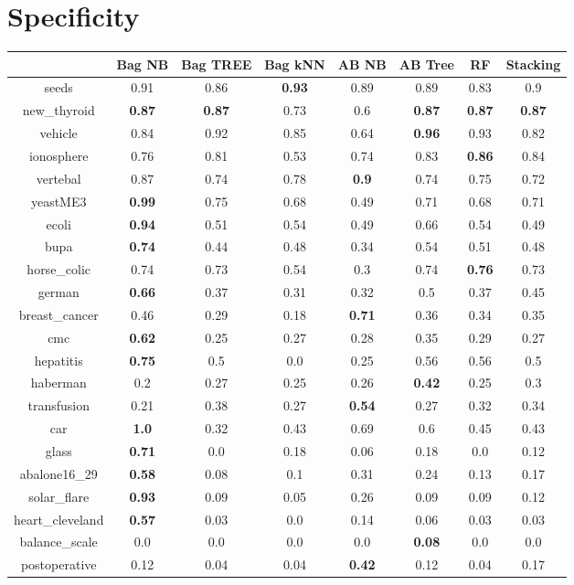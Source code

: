 \documentclass{article}%
\begin{document}
%
\section*{Specificity}%
\begin{tabular}{c|ccccccc}%
&Bag NB&Bag TREE&Bag kNN&AB NB&AB Tree&RF&Stacking\\%
\hline%
seeds&0.91&0.86&\textbf{0.93}&0.89&0.89&0.83&0.9\\%
new\_thyroid&\textbf{0.87}&\textbf{0.87}&0.73&0.6&\textbf{0.87}&\textbf{0.87}&\textbf{0.87}\\%
vehicle&0.84&0.92&0.85&0.64&\textbf{0.96}&0.93&0.82\\%
ionosphere&0.76&0.81&0.53&0.74&0.83&\textbf{0.86}&0.84\\%
vertebal&0.87&0.74&0.78&\textbf{0.9}&0.74&0.75&0.72\\%
yeastME3&\textbf{0.99}&0.75&0.68&0.49&0.71&0.68&0.71\\%
ecoli&\textbf{0.94}&0.51&0.54&0.49&0.66&0.54&0.49\\%
bupa&\textbf{0.74}&0.44&0.48&0.34&0.54&0.51&0.48\\%
horse\_colic&0.74&0.73&0.54&0.3&0.74&\textbf{0.76}&0.73\\%
german&\textbf{0.66}&0.37&0.31&0.32&0.5&0.37&0.45\\%
breast\_cancer&0.46&0.29&0.18&\textbf{0.71}&0.36&0.34&0.35\\%
cmc&\textbf{0.62}&0.25&0.27&0.28&0.35&0.29&0.27\\%
hepatitis&\textbf{0.75}&0.5&0.0&0.25&0.56&0.56&0.5\\%
haberman&0.2&0.27&0.25&0.26&\textbf{0.42}&0.25&0.3\\%
transfusion&0.21&0.38&0.27&\textbf{0.54}&0.27&0.32&0.34\\%
car&\textbf{1.0}&0.32&0.43&0.69&0.6&0.45&0.43\\%
glass&\textbf{0.71}&0.0&0.18&0.06&0.18&0.0&0.12\\%
abalone16\_29&\textbf{0.58}&0.08&0.1&0.31&0.24&0.13&0.17\\%
solar\_flare&\textbf{0.93}&0.09&0.05&0.26&0.09&0.09&0.12\\%
heart\_cleveland&\textbf{0.57}&0.03&0.0&0.14&0.06&0.03&0.03\\%
balance\_scale&0.0&0.0&0.0&0.0&\textbf{0.08}&0.0&0.0\\%
postoperative&0.12&0.04&0.04&\textbf{0.42}&0.12&0.04&0.17\\%
\end{tabular}

%
\end{document}
